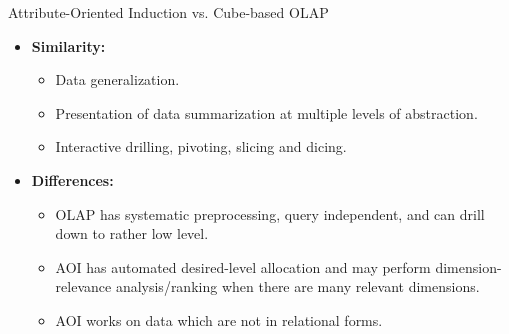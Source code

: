 \begin{frame}{Attribute-Oriented Induction vs. Cube-based OLAP}
  \begin{itemize}
  \item \textbf{Similarity:}
    \begin{itemize}
    \item Data generalization.
    \item Presentation of data summarization at multiple levels of abstraction.
    \item Interactive drilling, pivoting, slicing and dicing.
    \end{itemize}
  \item \textbf{Differences:}
    \begin{itemize}
    \item OLAP has systematic preprocessing, query independent, and can drill down to rather low level.
    \item AOI has automated desired-level allocation and may perform dimension-relevance analysis/ranking when there are many relevant dimensions.
    \item AOI works on data which are not in relational forms.
    \end{itemize}
  \end{itemize}
\end{frame}
